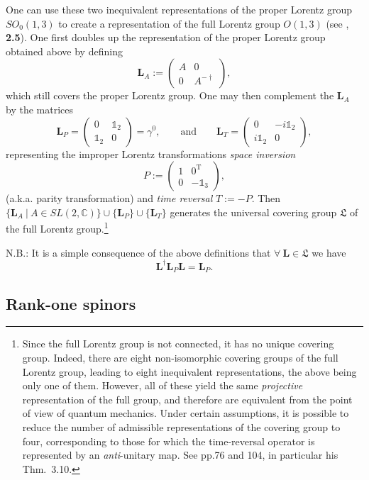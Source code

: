 \documentclass[12pt]{article}
\theoremstyle{definition}
\numberwithin{equation}{section}
\newcommand{\bL}{\mathbf{L}}
\newcommand{\beq}{\begin{equation}}
\newcommand{\eeq}{\end{equation}}
\newcommand{\Id}{\mathds{1}}
\newcommand{\fL}{\mathfrak{L}}
\newcommand{\Cset}{{\mathbb C}}
\newcommand{\ga}{\gamma}
\begin{document}
 One can use these two inequivalent representations of the proper Lorentz group $SO_0(1,3)$  to create a representation of the full 
Lorentz group $O(1,3)$ (see \cite{ThallerBOOK},  {\bf 2.5}). 
 One first doubles up the representation of the proper Lorentz group obtained above by defining 
\beq 
\bL_A := \left(\begin{array}{cc} A & 0 \\ 0 & A^{-\dagger} \end{array}\right),
\eeq
which still covers the proper Lorentz group.
  One may then complement the $\bL_A$ by the matrices 
\beq 
\bL_P = \left(\begin{array}{cc} 0 & \Id_2\\ \Id_2 & 0 \end{array}\right) = \ga^0,
\qquad\mbox{and}\qquad
 \bL_T = \left(\begin{array}{cc} 0 & -i\Id_2\\ i\Id_2 & 0 \end{array}\right),
\eeq
representing the improper Lorentz transformations \emph{space inversion} 
\beq\label{def:Pinver}
P := \left(\begin{array}{cc} 1 & 0^{\mathrm{T}} \\ 0 & -\Id_3\end{array}\right),
\eeq
(a.k.a. parity transformation) 
and \emph{time reversal} $T := -P$.
 Then $\{ \bL_A \ |\ A \in SL(2,\Cset)\}\cup\{\bL_P\}\cup\{\bL_T\}$ generates the universal covering group $\fL$ 
of the full Lorentz group.\footnote{Since the full Lorentz group is not connected, it has no unique covering group. 
Indeed, there are eight non-isomorphic covering groups of the full Lorentz group, leading to eight inequivalent representations, 
the above being only one of them.  
 However, all of these yield the same {\em projective} representation of the full group, and 
therefore are equivalent from the point of view of quantum mechanics. 
 Under certain assumptions, it is possible to reduce the number of admissible representations of the covering group to four, 
corresponding to those for which the time-reversal operator is represented by an {\em anti}-unitary map. 
See \cite{ThallerBOOK} pp.76 and 104, in particular his Thm.~3.10.}  

 N.B.: It is a simple consequence of the above definitions that $\forall\ \bL \in \fL$ we have
\beq \label{LPprop}
\bL^\dag \bL_P \bL = \bL_P.
\eeq


\subsection{Rank-one spinors}
\end{document}
